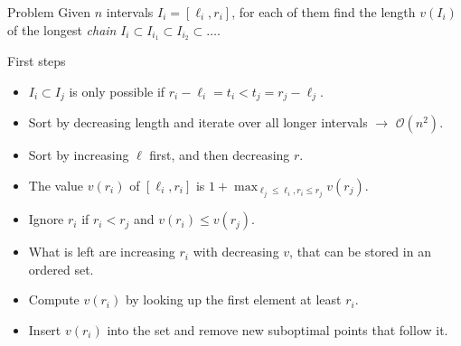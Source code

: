 \begin{frame}
    \frametitle{\problemtitle}
    \begin{block}{Problem}
      Given $n$ intervals $I_i=[\ell_i, r_i]$, for each of them find the length
      $v(I_i)$ of
      the longest \emph{chain} $I_i \subset I_{i_1} \subset I_{i_2}\subset \dots$.
    \end{block}
    \pause
    \begin{block}{First steps}
        \begin{itemize}
            \item<+-> $I_i \subset I_j$ is only possible if
                $r_i-\ell_i=t_i < t_j = r_j - \ell_j$.
            \item<+-> Sort by decreasing length and iterate over all longer
                intervals $\rightarrow$ $\mathcal O(n^2)$.
          \item<+-> Sort by increasing $\ell$ first, and then decreasing $r$.
          \item<+-> The value $v(r_i)$ of $[\ell_i, r_i]$ is $1+\max_{\ell_j \leq \ell_i, r_i \leq r_j} v(r_j)$.
          \item<+-> Ignore $r_i$ if $r_i < r_j$ and $v(r_i) \leq v(r_j)$.
          \item<+-> What is left are increasing $r_i$ with decreasing $v$, that
                can be stored in an ordered set.
          \item<+-> Compute $v(r_i)$ by looking up the first element at least $r_i$.
          \item<+-> Insert $v(r_i)$ into the set and remove new suboptimal points
                that follow it.
        \end{itemize}
    \end{block}
    \solvestats
\end{frame}
